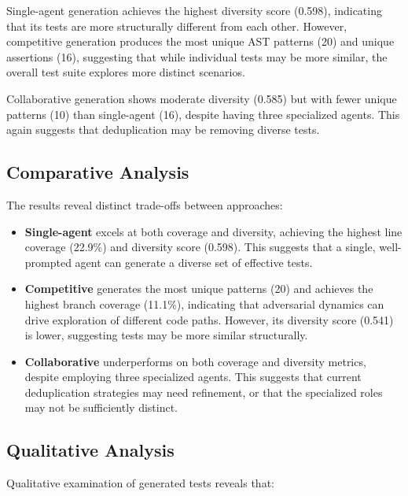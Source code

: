 \documentclass[11pt]{article}
\begin{document}
Single-agent generation achieves the highest diversity score (0.598), indicating that its tests are more structurally different from each other. However, competitive generation produces the most unique AST patterns (20) and unique assertions (16), suggesting that while individual tests may be more similar, the overall test suite explores more distinct scenarios.

Collaborative generation shows moderate diversity (0.585) but with fewer unique patterns (10) than single-agent (16), despite having three specialized agents. This again suggests that deduplication may be removing diverse tests.

\subsection{Comparative Analysis}

The results reveal distinct trade-offs between approaches:

\begin{itemize}
\item \textbf{Single-agent} excels at both coverage and diversity, achieving the highest line coverage (22.9\%) and diversity score (0.598). This suggests that a single, well-prompted agent can generate a diverse set of effective tests.
\item \textbf{Competitive} generates the most unique patterns (20) and achieves the highest branch coverage (11.1\%), indicating that adversarial dynamics can drive exploration of different code paths. However, its diversity score (0.541) is lower, suggesting tests may be more similar structurally.
\item \textbf{Collaborative} underperforms on both coverage and diversity metrics, despite employing three specialized agents. This suggests that current deduplication strategies may need refinement, or that the specialized roles may not be sufficiently distinct.
\end{itemize}

\subsection{Qualitative Analysis}

Qualitative examination of generated tests reveals that:
\end{document}
